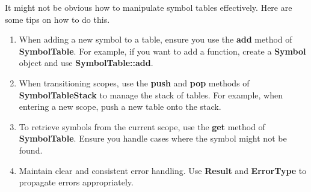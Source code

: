 \documentclass[
	12pt, %
]{fphw}
\begin{document}
\begin{problem}
    It might not be obvious how to manipulate symbol tables effectively. Here are some tips on how to do this.
    \\
    \begin{enumerate}
        \item When adding a new symbol to a table, ensure you use the \textbf{add} method of \textbf{SymbolTable}. For example, if you want to add a function, create a \textbf{Symbol} object and use \textbf{SymbolTable::add}.
        \item When transitioning scopes, use the \textbf{push} and \textbf{pop} methods of \textbf{SymbolTableStack} to manage the stack of tables. For example, when entering a new scope, push a new table onto the stack.
        \item To retrieve symbols from the current scope, use the \textbf{get} method of \textbf{SymbolTable}. Ensure you handle cases where the symbol might not be found.
        \item Maintain clear and consistent error handling. Use \textbf{Result} and \textbf{ErrorType} to propagate errors appropriately.
    \end{enumerate}
\end{problem}

\pagebreak
\end{document}
